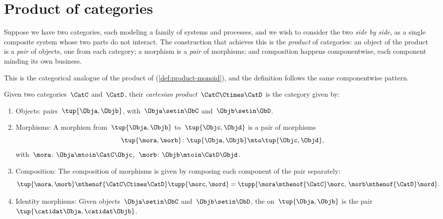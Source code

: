 
\section{Product of categories}
\label{sec:product-of-categories}


Suppose we have two categories, each modeling a family of systems and processes, and we wish to consider the two \emph{side by side}, as a single composite system whose two parts do not interact.
The construction that achieves this is the \emph{product} of categories: an object of the product is a \emph{pair} of objects, one from each category; a morphism is a \emph{pair} of morphisms; and composition happens componentwise, each component minding its own business.

This is the categorical analogue of the product of  (\cref{def:product-monoid}), and the definition follows the same componentwise pattern.

\begin{ctdefinition}
    \label{def:cartesian-product-category}
    Given two categories~$\CatC$ and~$\CatD$, their \emph{cartesian product}~$\CatC \Ctimes \CatD$ is the category given by:

    \constit

    \begin{enumerate}
        \item Objects: pairs~$\tup{\Obja,\Objb}$, with~$\Obja\setin \ObC$ and~$\Objb\setin \ObD$.
        \item Morphisms: A morphism from~$\tup{\Obja, \Objb}$ to~$\tup{\Objc,\Objd}$ is a pair of morphisms
              \begin{equation}\label{eq:prod-cat-morphisms}
                  \tup{\mora,\morb} \colon \tup{\Obja,\Objb}\mto \tup{\Objc,\Objd},
              \end{equation}
              with~$\mora\colon \Obja \mtoin\CatC \Objc$,~$\morb\colon \Objb\mtoin\CatD \Objd$.
        \item Composition: The composition of morphisms is given by composing each component of the pair separately:
              \begin{equation}
                  \tup{\mora,\morb}\mthenof{\CatC\Ctimes\CatD} \tupp{\morc,\mord}=\tupp{\mora\mthenof{\CatC}\morc,\, \morb \mthenof{\CatD} \mord}.
              \end{equation}
        \item Identity morphisms: Given objects~$\Obja\setin \ObC$ and~$\Objb\setin \ObD$, the  on~$\tup{\Obja,\Objb}$ is the pair $\tup{\catidat\Obja,\catidat\Objb}$.
    \end{enumerate}
\end{ctdefinition}

